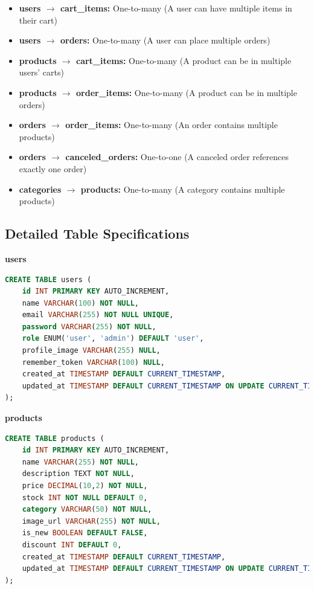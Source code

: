 \documentclass[14pt,a4paper]{article}
\begin{document}
\begin{itemize}
	\item \textbf{users $\rightarrow$ cart\_items:} One-to-many (A user can have multiple items in their cart)
	\item \textbf{users $\rightarrow$ orders:} One-to-many (A user can place multiple orders)
	\item \textbf{products $\rightarrow$ cart\_items:} One-to-many (A product can be in multiple users' carts)
	\item \textbf{products $\rightarrow$ order\_items:} One-to-many (A product can be in multiple orders)
	\item \textbf{orders $\rightarrow$ order\_items:} One-to-many (An order contains multiple products)
	\item \textbf{orders $\rightarrow$ canceled\_orders:} One-to-one (A canceled order references exactly one order)
	\item \textbf{categories $\rightarrow$ products:} One-to-many (A category contains multiple products)
\end{itemize}

\subsection{Detailed Table Specifications}

\begin{mdframed}[backgroundcolor=blue!5, linecolor=blue!40, linewidth=1pt]
	\textbf{users}
	\begin{lstlisting}[language=SQL, numbers=none]
CREATE TABLE users (
    id INT PRIMARY KEY AUTO_INCREMENT,
    name VARCHAR(100) NOT NULL,
    email VARCHAR(255) NOT NULL UNIQUE,
    password VARCHAR(255) NOT NULL,
    role ENUM('user', 'admin') DEFAULT 'user',
    profile_image VARCHAR(255) NULL,
    remember_token VARCHAR(100) NULL,
    created_at TIMESTAMP DEFAULT CURRENT_TIMESTAMP,
    updated_at TIMESTAMP DEFAULT CURRENT_TIMESTAMP ON UPDATE CURRENT_TIMESTAMP
);
\end{lstlisting}
\end{mdframed}

\begin{mdframed}[backgroundcolor=blue!5, linecolor=blue!40, linewidth=1pt]
	\textbf{products}
	\begin{lstlisting}[language=SQL, numbers=none]
CREATE TABLE products (
    id INT PRIMARY KEY AUTO_INCREMENT,
    name VARCHAR(255) NOT NULL,
    description TEXT NOT NULL,
    price DECIMAL(10,2) NOT NULL,
    stock INT NOT NULL DEFAULT 0,
    category VARCHAR(50) NOT NULL,
    image_url VARCHAR(255) NOT NULL,
    is_new BOOLEAN DEFAULT FALSE,
    discount INT DEFAULT 0,
    created_at TIMESTAMP DEFAULT CURRENT_TIMESTAMP,
    updated_at TIMESTAMP DEFAULT CURRENT_TIMESTAMP ON UPDATE CURRENT_TIMESTAMP
);
\end{lstlisting}
\end{mdframed}
\end{document}
